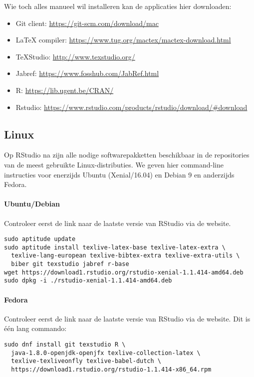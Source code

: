 Wie toch alles manueel wil installeren kan de applicaties hier downloaden:

\begin{itemize}
  \item Git client: \url{https://git-scm.com/download/mac}
  \item \LaTeX{} compiler: \url{https://www.tug.org/mactex/mactex-download.html}
  \item TeXStudio: \url{http://www.texstudio.org/}
  \item Jabref: \url{https://www.fosshub.com/JabRef.html}
  \item R: \url{https://lib.ugent.be/CRAN/}
  \item Rstudio: \url{https://www.rstudio.com/products/rstudio/download/#download}
\end{itemize}

\subsection{Linux}

Op RStudio na zijn alle nodige softwarepakketten beschikbaar in de repositories van de meest gebruikte Linux-distributies. We geven hier command-line instructies voor enerzijds Ubuntu (Xenial/16.04) en Debian 9 en anderzijds Fedora.

\paragraph{Ubuntu/Debian} 

Controleer eerst de link naar de laatste versie van RStudio via de website.

\begin{verbatim}
sudo aptitude update
sudo aptitude install texlive-latex-base texlive-latex-extra \
  texlive-lang-european texlive-bibtex-extra texlive-extra-utils \
  biber git texstudio jabref r-base
wget https://download1.rstudio.org/rstudio-xenial-1.1.414-amd64.deb
sudo dpkg -i ./rstudio-xenial-1.1.414-amd64.deb
\end{verbatim}

\paragraph{Fedora}

Controleer eerst de link naar de laatste versie van RStudio via de website. Dit is één lang commando:

\begin{verbatim}
sudo dnf install git texstudio R \
  java-1.8.0-openjdk-openjfx texlive-collection-latex \
  texlive-texliveonfly texlive-babel-dutch \
  https://download1.rstudio.org/rstudio-1.1.414-x86_64.rpm
\end{verbatim}

